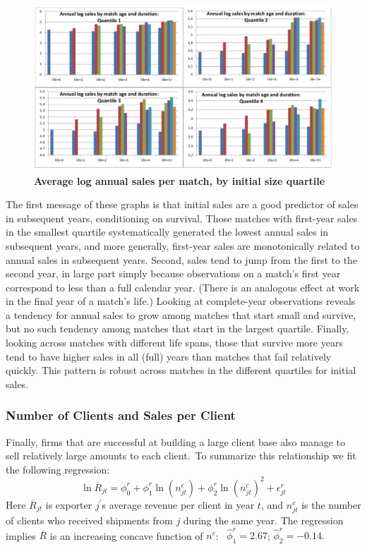 \documentclass[12pt,titlepage]{article}
\begin{document}
\begin{center}
\begin{figure}
    \includegraphics[width=\textwidth]{figures/figure1.pdf}
    \caption{\textbf{Average log annual sales per match, by initial size quartile}}
    \label{fig:match_maturation}
\end{figure}
\end{center}

The first message of these graphs is that initial sales are a good predictor
of sales in subsequent years, conditioning on survival. Those matches with
first-year sales in the smallest quartile systematically generated the
lowest annual sales in subsequent years, and more generally, first-year
sales are monotonically related to annual sales in subsequent years. Second,
sales tend to jump from the first to the second year, in large part simply
because observations on a match's first year correspond to less than a full
calendar year. (There is an analogous effect at work in the final year of a
match's life.) Looking at complete-year observations reveals a tendency for
annual sales to grow among matches that start small and survive, but no such
tendency among matches that start in the largest quartile. Finally, looking
across matches with different life spans, those that survive more years tend
to have higher sales in all (full) years than matches that fail relatively
quickly. This pattern is robust across matches in the different quartiles
for initial sales.

\subsubsection{Number of Clients and Sales per Client}

Finally, firms that are successful at building a large client base also
manage to sell relatively large amounts to each client.\ To summarize this
relationship we fit the following regression:%
\begin{equation*}
\ln \overline{R}_{jt}=\phi _{0}^{r}+\phi _{1}^{r}\ln (n_{jt}^{c})+\phi
_{2}^{r}\ln (n_{jt}^{c})^{2}+\epsilon _{jt}^{r}
\end{equation*}%
Here $\overline{R}_{jt}$ is exporter $j^{\prime }$s average revenue per
client in year $t$, and $n_{jt}^{c}$ is the number of clients who received
shipments from $j$ during the same year. The regression implies $\overline{R}
$ is an increasing concave function of $n^{c}$: \ $\widehat{\phi }%
_{1}^{r}=2.67$; $\widehat{\phi }_{2}^{r}=-0.14.$
\end{document}
